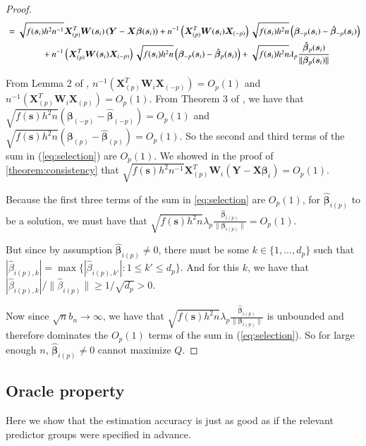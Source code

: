 \documentclass[authoryear, review, 11pt]{elsarticle}
\begin{document}
\begin{proof}
\begin{align}
        &= \sqrt{f(\bm{s}_i) h^2 n^{-1}} \bm{X}_{(p)}^T \bm{W}(\bm{s}_i) \left( \bm{Y} - \bm{X} \bm{\beta}(\bm{s}_i) \right) +  n^{-1} \left( \bm{X}_{(p)}^T  \bm{W}(\bm{s}_i) \bm{X}_{(-p)} \right) \sqrt{f(\bm{s}_i) h^2 n} \left( \bm{\beta}_{-p}(\bm{s}_i) - \hat{\bm{\beta}}_{-p}(\bm{s}_i) \right) \notag \\
        &\mkern+72mu+ n^{-1} \left( \bm{X}_{(p)}^T \bm{W}(\bm{s}_i) \bm{X}_{(-p)} \right) \sqrt{f(\bm{s}_i) h^2 n} \left( \bm{\beta}_{-p}(\bm{s}_i) - \hat{\bm{\beta}}_p(\bm{s}_i) \right) + \sqrt{f(\bm{s}_i) h^2 n} \lambda_p \frac{ \hat{\bm{\beta}}_p(\bm{s}_i) }{\| \bm{\beta}_p(\bm{s}_i) \|}
      \end{align}
      
      From Lemma 2 of \cite{Sun-Yan-Zhang-Lu-2014}, $n^{-1} \left( \bm{X}_{(p)}^T \bm{W}_i \bm{X}_{(-p)} \right) = O_p(1)$ and $n^{-1} \left( \bm{X}_{(p)}^T \bm{W}_i \bm{X}_{(p)} \right) = O_p(1)$. From Theorem 3 of \cite{Sun-Yan-Zhang-Lu-2014}, we have that $\sqrt{f(\bm{s}) h^2 n} \left( \bm{\beta}_{(-p)} - \hat{\bm{\beta}}_{(-p)} \right) = O_p(1)$ and $\sqrt{f(\bm{s}) h^2 n} \left( \bm{\beta}_{(p)} - \hat{\bm{\beta}}_{(p)} \right) = O_p(1)$. So the second and third terms of the sum in (\ref{eq:selection}) are $O_p(1)$. We showed in the proof of \ref{theorem:consistency} that $\sqrt{f(\bm{s}) h^2 n^{-1}} \bm{X}_{(p)}^T \bm{W}_i \left( \bm{Y} - \bm{X} \bm{\beta}_i \right) = O_p(1)$.

      Because the first three terms of the sum in \ref{eq:selection} are $O_p(1)$, for $\hat{\bm{\beta}}_{i(p)}$ to be a solution, we must have that $\sqrt{f(\bm{s}) h^2 n} \lambda_p \frac{ \hat{\bm{\beta}}_{i(p)} }{\| \bm{\beta}_{i(p)} \|} = O_p(1)$.

      But since by assumption $\hat{\bm{\beta}}_{i(p)} \ne 0$, there must be some $k \in \{ 1, \dots, d_p \}$ such that $ | \hat{\beta}_{i(p),k} | = \max \{ | \hat{\beta}_{i(p),k'} | : 1 \le k' \le d_p \} $. And for this $k$, we have that $| \hat{\beta}_{i(p),k} | / \| \hat{\beta}_{i(p)} \| \ge 1 / \sqrt{d_p} > 0$.

      Now since $\sqrt{n} b_n \to \infty$, we have that $\sqrt{f(\bm{s}) h^2 n} \lambda_p \frac{ \hat{\bm{\beta}}_{i(p)} }{\| \bm{\beta}_{i(p)} \|}$ is unbounded and therefore dominates the $O_p(1)$ terms of the sum in (\ref{eq:selection}). So for large enough $n$, $\hat{\bm{\beta}}_{i(p)} \ne 0$ cannot maximize $Q$.
    \end{proof}

  \subsection{Oracle property}
    Here we show that the estimation accuracy is just as good as if the relevant predictor groups were specified in advance.
\end{document}
